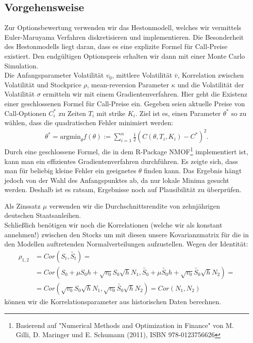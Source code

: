 \documentclass[a4paper,12pt]{article}
\numberwithin[\arabic]{Satz}{section}
\begin{document}
		\subsection*{Vorgehensweise}
		Zur Optionsbewertung verwenden wir das Hestonmodell, welches wir vermittels Euler-Maruyama Verfahren diskretisieren und implementieren. Die Besonderheit des Hestonmodells liegt daran, dass es eine explizite Formel für Call-Preise existiert. Den endgültigen Optionspreis erhalten wir dann mit einer Monte Carlo Simulation.\\
		Die Anfangsparameter Volatilität $v_0$, mittlere Volatilität $\bar{v}$, Korrelation zwischen Volatilität und Stockprice $\rho$, mean-reversion Parameter $\kappa$ und die Volatilität der Volatilität $\sigma$ ermitteln wir mit einem Gradientenverfahren. Hier geht die Existenz einer geschlossenen Formel für Call-Preise ein. Gegeben seien aktuelle Preise von Call-Optionen $C_i^*$ zu Zeiten $T_i$ mit strike $K_i$. Ziel ist es, einen Parameter $\theta^*$ so zu wählen, dass die quadratischen Fehler minimiert werden:
		\begin{gather*}
		\theta^*=\text{argmin}_{\theta} f(\theta):=\sum_{i=1}^n \frac12 (C(\theta,T_i,K_i)-C^*)^2.
		\end{gather*}
		Durch eine geschlossene Formel, die in dem R-Package \glqq NMOF\grqq\footnote{Basierend auf "Numerical Methods and Optimization in Finance" von M. Gilli, D. Maringer und E. Schumann (2011), ISBN 978-0123756626} implementiert ist, kann man ein effizientes Gradientenverfahren durchführen. Es zeigte sich, dass man für beliebig kleine Fehler ein geeignetes $\theta$ finden kann. Das Ergebnis hängt jedoch von der Wahl des Anfangspunktes ab, da nur lokale Minima gesucht werden. Deshalb ist es ratsam, Ergebnisse noch auf Plausibilität zu überprüfen.
		
		
		Als Zinssatz $\mu$ verwenden wir die Durchschnittsrendite von zehnjährigen deutschen Staatsanleihen.\\
		Schließlich benötigen wir noch die Korrelationen (welche wir als konstant annehmen!) zwischen den Stocks um mit diesen unsere Kovarianzmatrix für die in den Modellen auftretenden Normalverteilungen aufzustellen.
		Wegen der Identität:
		\begin{align*}
			\rho_{1,2}&=Cor(S_t,\tilde{S_t})=\\
			&=Cor(S_0+\mu S_0h+\sqrt{v_0}S_0\sqrt{h}N_1,\tilde{S_0}+\mu \tilde{S_0}h+\sqrt{v_0}\tilde{S_0}\sqrt{h}N_2)= \\
			&=Cor(\sqrt{v_0}S_0\sqrt{h}N_1,\sqrt{v_0}\tilde{S_0}\sqrt{h}N_2)=Cor(N_1,N_2)
		\end{align*}
		können wir die Korrelationsparameter aus historischen Daten berechnen.
		
\end{document}

